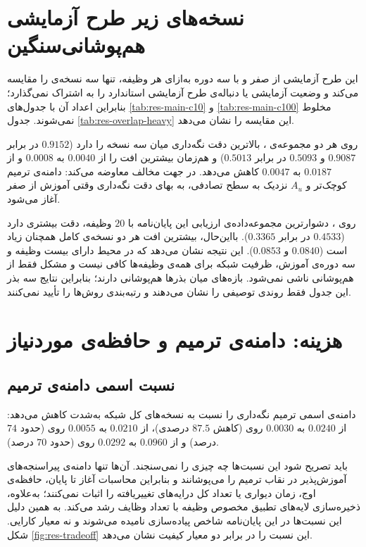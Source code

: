 \section{نسخه‌های  زیر طرح آزمایشی هم‌پوشانی‌سنگین}
\label{sec:res-overlap-heavy}

این طرح آزمایشی از صفر و با سه دوره به‌ازای هر وظیفه، تنها سه نسخه‌ی  را مقایسه می‌کند و وضعیت آزمایشی یا دنباله‌ی طرح آزمایشی استاندارد را به اشتراک نمی‌گذارد؛ بنابراین اعداد آن با جدول‌های \ref{tab:res-main-c10} و \ref{tab:res-main-c100} مخلوط نمی‌شوند. جدول \ref{tab:res-overlap-heavy} این مقایسه را نشان می‌دهد.



روی هر دو مجموعه‌ی ،  بالاترین دقت نگه‌داری میان سه نسخه را دارد ($0.9152$ در برابر $0.9087$ و $0.5093$ در برابر $0.5013$) و هم‌زمان بیشترین افت را از $0.0040$ به $0.0008$ و از $0.0187$ به $0.0047$ کاهش می‌دهد.  در جهت مخالف معاوضه می‌کند: دامنه‌ی ترمیم کوچک‌تر و $A_u$ نزدیک به سطح تصادفی، به بهای دقت نگه‌داری وقتی آموزش از صفر آغاز می‌شود.

روی ، دشوارترین مجموعه‌داده‌ی ارزیابی این پایان‌نامه با $20$ وظیفه،  دقت بیشتری دارد ($0.4533$ در برابر $0.3365$). بااین‌حال، بیشترین افت هر دو نسخه‌ی کامل همچنان زیاد است ($0.0840$ و $0.0853$). این نتیجه نشان می‌دهد که در محیط دارای بیست وظیفه و سه دوره‌ی آموزش، ظرفیت شبکه برای همه‌ی وظیفه‌ها کافی نیست و مشکل فقط از هم‌پوشانی ناشی نمی‌شود. بازه‌های میان بذرها هم‌پوشانی دارند؛ بنابراین نتایج سه بذر این جدول فقط روندی توصیفی را نشان می‌دهند و رتبه‌بندی روش‌ها را تأیید نمی‌کنند.

\section{هزینه: دامنه‌ی ترمیم و حافظه‌ی موردنیاز}
\label{sec:res-storage}

\subsection{نسبت اسمی دامنه‌ی ترمیم}
\label{subsec:res-rupd}

 دامنه‌ی اسمی ترمیم نگه‌داری را نسبت به نسخه‌های کل شبکه به‌شدت کاهش می‌دهد: از $0.0240$ به $0.0030$ روی  (کاهش $87.5$ درصدی)، از $0.0210$ به $0.0055$ روی  (حدود $74$ درصد) و از $0.0960$ به $0.0292$ روی  (حدود $70$ درصد).

باید تصریح شود این نسبت‌ها چه چیزی را نمی‌سنجند. آن‌ها تنها دامنه‌ی پیراسنجه‌های آموزش‌پذیر در نقاب ترمیم را می‌پوشانند و بنابراین محاسبات آغاز تا پایان، حافظه‌ی اوج، زمان دیواری یا تعداد کل درایه‌های تغییریافته را اثبات نمی‌کنند؛ به‌علاوه، ذخیره‌سازی لایه‌های تطبیق مخصوص وظیفه با تعداد وظایف رشد می‌کند. به همین دلیل این نسبت‌ها در این پایان‌نامه شاخص پیاده‌سازی نامیده می‌شوند و نه معیار کارایی. شکل \ref{fig:res-tradeoff} این نسبت را در برابر دو معیار کیفیت نشان می‌دهد.

